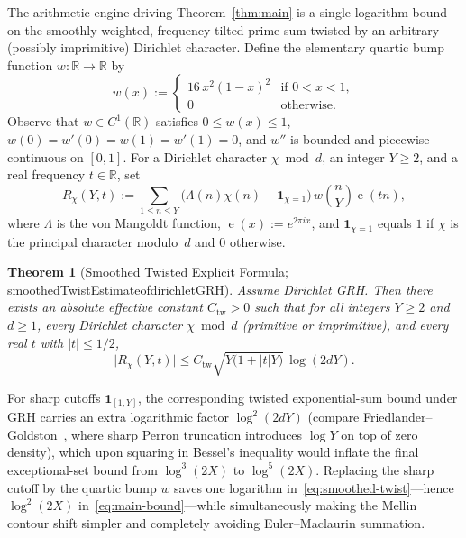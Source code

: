 \documentclass[11pt,reqno]{amsart}
\numberwithin{equation}{section}
\newtheorem{theorem}{Theorem}[section]
\theoremstyle{definition}
\newcommand{\R}{\mathbb{R}}
\newcommand{\1}{\mathbf{1}}
\newcommand{\e}{\operatorname{e}}
\newcommand{\lean}[1]{{\footnotesize\ttfamily\renewcommand{\_}{\textunderscore\allowbreak}#1}}
\newcommand{\GRH}{\textup{GRH}}
\begin{document}
The arithmetic engine driving Theorem~\ref{thm:main} is a single-logarithm bound on the smoothly weighted, frequency-tilted prime sum twisted by an arbitrary (possibly imprimitive) Dirichlet character. Define the elementary quartic bump function $w : \R \to \R$ by
\begin{equation}\label{eq:quartic-bump}
  w(x) := \begin{cases} 16\, x^2 (1 - x)^2 & \text{if } 0 < x < 1, \\ 0 & \text{otherwise.} \end{cases}
\end{equation}
Observe that $w \in C^1(\R)$ satisfies $0 \le w(x) \le 1$, $w(0) = w'(0) = w(1) = w'(1) = 0$, and $w''$ is bounded and piecewise continuous on $[0, 1]$. For a Dirichlet character $\chi \bmod d$, an integer $Y \ge 2$, and a real frequency $t \in \R$, set
\begin{equation}\label{eq:tilted-rem}
  R_\chi(Y, t) := \sum_{1 \le n \le Y} \bigl(\Lambda(n)\chi(n) - \1_{\chi=1}\bigr)\, w\!\left(\frac{n}{Y}\right) \e(t n),
\end{equation}
where $\Lambda$ is the von Mangoldt function, $\e(x) := e^{2\pi i x}$, and $\1_{\chi=1}$ equals $1$ if $\chi$ is the principal character modulo~$d$ and $0$ otherwise.

\begin{theorem}[Smoothed Twisted Explicit Formula; \lean{smoothedTwistEstimate\_of\_dirichletGRH}]
\label{thm:smoothed-twist}
Assume Dirichlet \GRH{}. Then there exists an absolute effective constant $C_{\mathrm{tw}} > 0$ such that for all integers $Y \ge 2$ and $d \ge 1$, every Dirichlet character $\chi \bmod d$ (primitive or imprimitive), and every real $t$ with $|t| \le 1/2$,
\begin{equation}\label{eq:smoothed-twist}
  \bigl|R_\chi(Y, t)\bigr| \le C_{\mathrm{tw}} \sqrt{Y\bigl(1 + |t| Y\bigr)}\,\log(2 d Y).
\end{equation}
\end{theorem}

For sharp cutoffs $\1_{[1, Y]}$, the corresponding twisted exponential-sum bound under \GRH{} carries an extra logarithmic factor $\log^2(2dY)$ (compare Friedlander--Goldston~\cite{FriedlanderGoldston1996}, where sharp Perron truncation introduces $\log Y$ on top of zero density), which upon squaring in Bessel's inequality would inflate the final exceptional-set bound from $\log^3(2X)$ to $\log^5(2X)$. Replacing the sharp cutoff by the quartic bump $w$ saves one logarithm in~\eqref{eq:smoothed-twist}---hence $\log^2(2X)$ in~\eqref{eq:main-bound}---while simultaneously making the Mellin contour shift simpler and completely avoiding Euler--Maclaurin summation.
\end{document}

